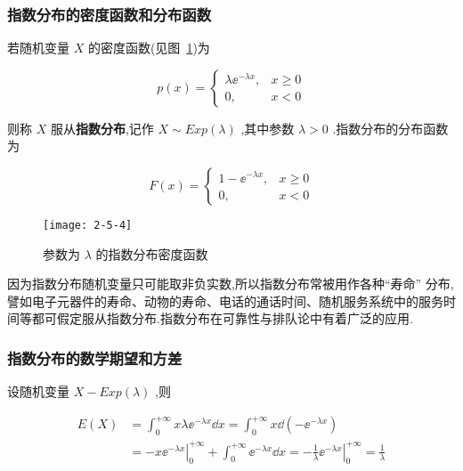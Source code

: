 \subsubsection{指数分布的密度函数和分布函数}

若随机变量 $ X $ 的密度函数(见图~\ref{fig:2.5.4})为

\begin{equation}
p(x)=\left\{\begin{array}{ll}
{\lambda \ee ^{-\lambda x},} & {x \geqslant 0} \\ 
{0,} & {x<0}
\end{array}\right. \label{eq:2.5.8}
\end{equation}

则称 $ X $ 服从\textbf{指数分布},记作 $ X \sim E x p(\lambda) $ ,其中参数 $ \lambda>0 $ .指数分布的分布函数为

\begin{equation}
F(x)=\left\{\begin{array}{ll}
{1-\ee ^{-\lambda x},} & {x \geqslant 0} \\ 
{0,} & {x<0}
\end{array}\right. \label{eq:2.5.9}
\end{equation}

\begin{figure}
	\centering
	\texttt{[image: 2-5-4]}
	\caption{参数为 $ \lambda $ 的指数分布密度函数}
	\label{fig:2.5.4}
\end{figure}

因为指数分布随机变量只可能取非负实数,所以指数分布常被用作各种“寿命”
分布,譬如电子元器件的寿命、动物的寿命、电话的通话时间、随机服务系统中的服务时间等都可假定服从指数分布.指数分布在可靠性与排队论中有着广泛的应用.

\subsubsection{指数分布的数学期望和方差}

设随机变量 $ X-E x p(\lambda) $ ,则

\[
\begin{aligned} 
E(X) &=\int_{0}^{+\infty} x \lambda \ee ^{-\lambda x} \dd x=\int_{0}^{+\infty} x \dd\left(-\ee ^{-\lambda x}\right) \\
&=-x\left.\ee ^{-\lambda x}\right|_{0} ^{+\infty}+\int_{0}^{+\infty} \ee ^{-\lambda x} \dd x=-\frac{1}{\lambda}\left.\ee ^{-\lambda x}\right|_{0} ^{+\infty}=\frac{1}{\lambda} 
\end{aligned}
\]


